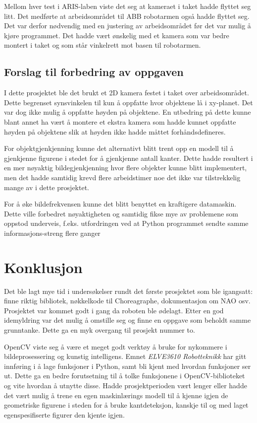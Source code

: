 \documentclass[conference]{IEEEtran}
\begin{document}
        Mellom hver test i ARIS-laben viste det seg at kameraet i taket hadde flyttet seg litt. Det medførte at arbeidsområdet til ABB robotarmen også hadde flyttet seg. Det var derfor nødvendig med en justering av arbeidsområdet før det var mulig å kjøre programmet. Det hadde vært ønskelig med et kamera som var bedre montert i taket og som står vinkelrett mot basen til robotarmen.

    \subsection{Forslag til forbedring av oppgaven}
        I dette prosjektet ble det brukt et 2D kamera festet i taket over arbeidsområdet. Dette begrenset synsvinkelen til kun å oppfatte hvor objektene lå i xy-planet. Det var dog ikke mulig å oppfatte høyden på objektene. En utbedring på dette kunne blant annet ha vært å montere et ekstra kamera som hadde kunnet oppfatte høyden på objektene slik at høyden ikke hadde måttet forhåndsdefineres. 

        For objektgjenkjenning kunne det alternativt blitt trent opp en modell til å gjenkjenne figurene i stedet for å gjenkjenne antall kanter. Dette hadde resultert i en mer nøyaktig bildegjenkjenning hvor flere objekter kunne blitt implementert, men det hadde samtidig krevd flere arbeidstimer noe det ikke var tilstrekkelig mange av i dette prosjektet.  

        For å øke bildefrekvensen kunne det blitt benyttet en kraftigere datamaskin. Dette ville forbedret nøyaktigheten og samtidig fikse mye av problemene som oppstod underveis, f.eks. utfordringen ved at Python programmet sendte samme informasjons-streng flere ganger

    
\section{Konklusjon}
    Det ble lagt mye tid i undersøkelser rundt det første prosjektet som ble igangsatt: finne riktig bibliotek, nøkkelkode til Choreagraphe, dokumentasjon om NAO osv. Prosjektet var kommet godt i gang da roboten ble ødelagt. Etter en god idemyldring var det mulig å omstille seg og finne en oppgave som beholdt samme grunntanke. Dette ga en myk overgang til prosjekt nummer to.

    OpenCV viste seg å være et meget godt verktøy å bruke for nykommere i bildeprosessering og kunstig intelligens. Emnet \textit{ELVE3610 Robotteknikk} har gitt innføring i å lage funksjoner i Python, samt bli kjent med hvordan funksjoner ser ut. Dette ga en bedre forutsetning til å tolke funksjonene i OpenCV-biblioteket og vite hvordan å utnytte disse. Hadde prosjektperioden vært lenger eller  hadde det vært mulig å trene en egen maskinlærings modell til å kjenne igjen de geometriske figurene i steden for å bruke kantdeteksjon, kanskje til og med laget egenspesifiserte figurer den kjente igjen. 
\end{document}
